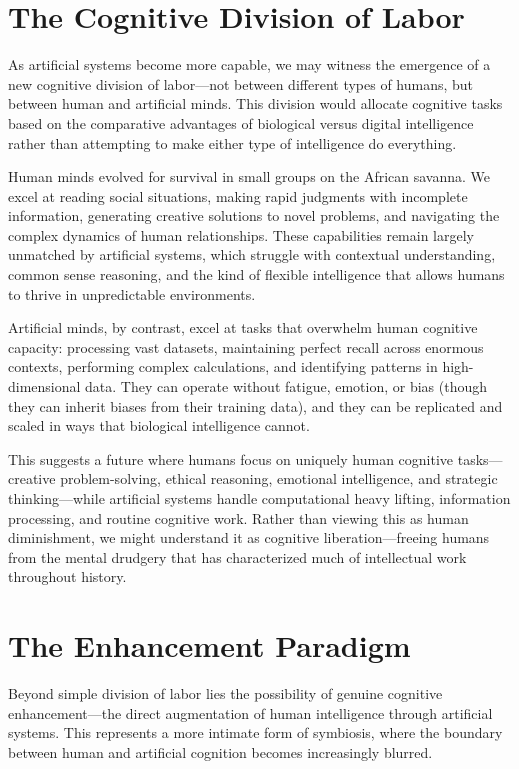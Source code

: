 \section{The Cognitive Division of Labor}

As artificial systems become more capable, we may witness the emergence of a new cognitive division of labor—not between different types of humans, but between human and artificial minds. This division would allocate cognitive tasks based on the comparative advantages of biological versus digital intelligence rather than attempting to make either type of intelligence do everything.

Human minds evolved for survival in small groups on the African savanna. We excel at reading social situations, making rapid judgments with incomplete information, generating creative solutions to novel problems, and navigating the complex dynamics of human relationships. These capabilities remain largely unmatched by artificial systems, which struggle with contextual understanding, common sense reasoning, and the kind of flexible intelligence that allows humans to thrive in unpredictable environments.

Artificial minds, by contrast, excel at tasks that overwhelm human cognitive capacity: processing vast datasets, maintaining perfect recall across enormous contexts, performing complex calculations, and identifying patterns in high-dimensional data. They can operate without fatigue, emotion, or bias (though they can inherit biases from their training data), and they can be replicated and scaled in ways that biological intelligence cannot.

This suggests a future where humans focus on uniquely human cognitive tasks—creative problem-solving, ethical reasoning, emotional intelligence, and strategic thinking—while artificial systems handle computational heavy lifting, information processing, and routine cognitive work. Rather than viewing this as human diminishment, we might understand it as cognitive liberation—freeing humans from the mental drudgery that has characterized much of intellectual work throughout history.

\section{The Enhancement Paradigm}

Beyond simple division of labor lies the possibility of genuine cognitive enhancement—the direct augmentation of human intelligence through artificial systems. This represents a more intimate form of symbiosis, where the boundary between human and artificial cognition becomes increasingly blurred.

